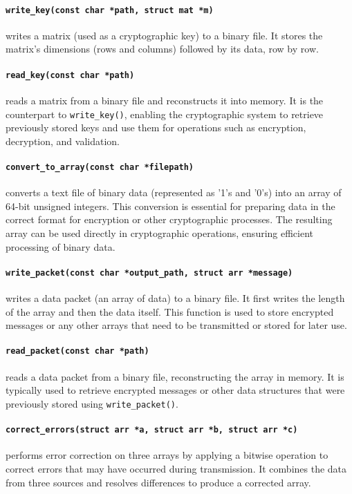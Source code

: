 \paragraph{\texttt{write\_key(const char *path, struct mat *m)}}
writes a matrix (used as a cryptographic key) to a binary file. It stores the matrix's dimensions (rows and columns) followed by its data, row by row.

\paragraph{\texttt{read\_key(const char *path)}}
reads a matrix from a binary file and reconstructs it into memory. It is the counterpart to \texttt{write\_key()}, enabling the cryptographic system to retrieve previously stored keys and use them for operations such as encryption, decryption, and validation.

\paragraph{\texttt{convert\_to\_array(const char *filepath)}}
converts a text file of binary data (represented as '1's and '0's) into an array of 64-bit unsigned integers. This conversion is essential for preparing data in the correct format for encryption or other cryptographic processes. The resulting array can be used directly in cryptographic operations, ensuring efficient processing of binary data.

\paragraph{\texttt{write\_packet(const char *output\_path, struct arr *message)}}
writes a data packet (an array of data) to a binary file. It first writes the length of the array and then the data itself. This function is used to store encrypted messages or any other arrays that need to be transmitted or stored for later use.

\paragraph{\texttt{read\_packet(const char *path)}}
reads a data packet from a binary file, reconstructing the array in memory. It is typically used to retrieve encrypted messages or other data structures that were previously stored using \texttt{write\_packet()}.

\paragraph{\texttt{correct\_errors(struct arr *a, struct arr *b, struct arr *c)}}
performs error correction on three arrays by applying a bitwise operation to correct errors that may have occurred during transmission. It combines the data from three sources and resolves differences to produce a corrected array.

